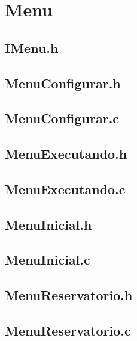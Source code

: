 \chapter{Menu}

\section{IMenu.h}


	
\section{MenuConfigurar.h}



\section{MenuConfigurar.c}




\section{MenuExecutando.h}



\section{MenuExecutando.c}




\section{MenuInicial.h}



\section{MenuInicial.c}




\section{MenuReservatorio.h}



\section{MenuReservatorio.c}

